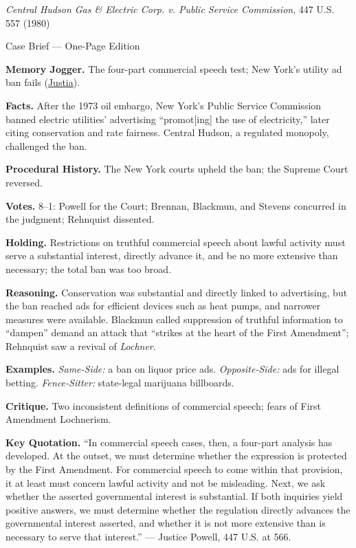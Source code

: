 \documentclass[12pt]{article}
\begin{document}
\begin{center}
{\Large \textit{Central Hudson Gas \& Electric Corp. v. Public Service Commission}, 447 U.S. 557 (1980)\par}
\vspace{0.3em}
{\normalsize Case Brief --- One-Page Edition\par}
\end{center}

\textbf{Memory Jogger.} The four-part commercial speech test; New York's utility ad ban fails (\href{https://supreme.justia.com/cases/federal/us/447/557/}{Justia}).

\textbf{Facts.} After the 1973 oil embargo, New York's Public Service Commission banned electric utilities' advertising ``promot[ing] the use of electricity,'' later citing conservation and rate fairness. Central Hudson, a regulated monopoly, challenged the ban.

\textbf{Procedural History.} The New York courts upheld the ban; the Supreme Court reversed.

\textbf{Votes.} 8--1: Powell for the Court; Brennan, Blackmun, and Stevens concurred in the judgment; Rehnquist dissented.

\textbf{Holding.} Restrictions on truthful commercial speech about lawful activity must serve a substantial interest, directly advance it, and be no more extensive than necessary; the total ban was too broad.

\textbf{Reasoning.} Conservation was substantial and directly linked to advertising, but the ban reached ads for efficient devices such as heat pumps, and narrower measures were available. Blackmun called suppression of truthful information to ``dampen'' demand an attack that ``strikes at the heart of the First Amendment''; Rehnquist saw a revival of \textit{Lochner}.

\textbf{Examples.} \emph{Same-Side:} a ban on liquor price ads. \emph{Opposite-Side:} ads for illegal betting. \emph{Fence-Sitter:} state-legal marijuana billboards.

\textbf{Critique.} Two inconsistent definitions of commercial speech; fears of First Amendment Lochnerism.

\textbf{Key Quotation.} ``In commercial speech cases, then, a four-part analysis has developed. At the outset, we must determine whether the expression is protected by the First Amendment. For commercial speech to come within that provision, it at least must concern lawful activity and not be misleading. Next, we ask whether the asserted governmental interest is substantial. If both inquiries yield positive answers, we must determine whether the regulation directly advances the governmental interest asserted, and whether it is not more extensive than is necessary to serve that interest.'' --- Justice Powell, 447 U.S. at 566.
\end{document}
